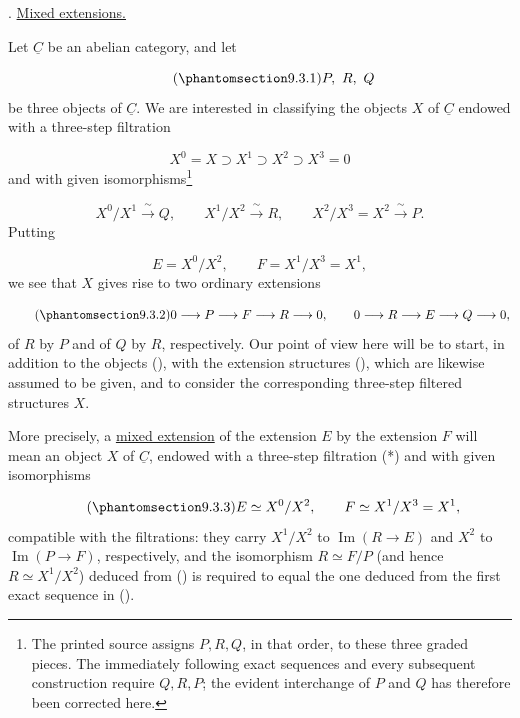 
\medskip
\noindent
{}. \underline{Mixed extensions.}

Let $\underline C$ be an abelian category, and let

\begin{equation}\tag{\SGARefTarget{sga7.sga7i.eix.n9-3-1}{9.3.1}}
P,\ R,\ Q
\end{equation}
be three objects of $\underline C$. We are interested in classifying the
objects $X$ of $\underline C$ endowed with a three-step filtration

\begin{equation}\tag{*}
X^0=X\supset X^1\supset X^2\supset X^3=0
\end{equation}
and with given isomorphisms\footnote{The printed source assigns $P,R,Q$,
in that order, to these three graded pieces.  The immediately following exact
sequences and every subsequent construction require $Q,R,P$; the evident
interchange of $P$ and $Q$ has therefore been corrected here.}

\begin{equation*}
X^0/X^1\xrightarrow{\ \sim\ }Q,
\qquad X^1/X^2\xrightarrow{\ \sim\ }R,
\qquad X^2/X^3=X^2\xrightarrow{\ \sim\ }P.
\end{equation*}
Putting

\begin{equation*}
E=X^0/X^2,
\qquad F=X^1/X^3=X^1,
\end{equation*}
we see that $X$ gives rise to two ordinary extensions

\begin{equation}\tag{\SGARefTarget{sga7.sga7i.eix.n9-3-2}{9.3.2}}
0\longrightarrow P\longrightarrow F\longrightarrow R\longrightarrow0,
\qquad
0\longrightarrow R\longrightarrow E\longrightarrow Q\longrightarrow0,
\end{equation}
of $R$ by $P$ and of $Q$ by $R$, respectively. Our point of view here will
be to start, in addition to the objects (), with the extension
structures (), which are likewise assumed to be given, and to consider
the corresponding three-step filtered structures $X$.

More precisely, a \underline{mixed extension} of the extension $E$ by the
extension $F$ will mean an object $X$ of $\underline C$, endowed with a
three-step filtration (*) and with given isomorphisms

\begin{equation}\tag{\SGARefTarget{sga7.sga7i.eix.n9-3-3}{9.3.3}}
E\simeq X^0/X^2,
\qquad F\simeq X^1/X^3=X^1,
\end{equation}
compatible with the filtrations: they carry $X^1/X^2$ to
$\operatorname{Im}(R\longrightarrow E)$ and $X^2$ to
$\operatorname{Im}(P\longrightarrow F)$, respectively, and the
isomorphism $R\simeq F/P$ (and hence $R\simeq X^1/X^2$) deduced from
() is required to equal the one deduced from the first exact sequence
in ().

